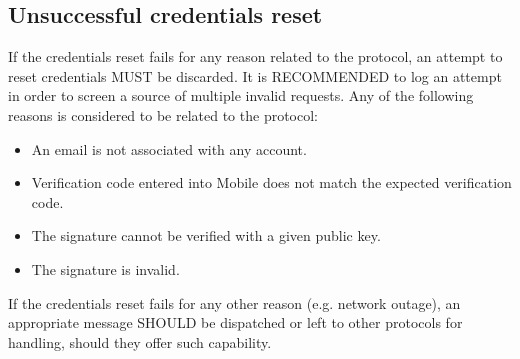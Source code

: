     \subsection{Unsuccessful credentials reset}
    If the credentials reset fails for any reason related to the protocol, an attempt to reset credentials MUST 
    be discarded. It is RECOMMENDED to log an attempt in order to screen a source of multiple invalid requests. 
    Any of the following reasons is considered to be related to the protocol:
        \begin{itemize}
            \item An email is not associated with any account.
            \item Verification code entered into Mobile does not match the expected verification code.
            \item The signature cannot be verified with a given public key.
            \item The signature is invalid.
        \end{itemize}
    If the credentials reset fails for any other reason (e.g. network outage), an appropriate message SHOULD be 
    dispatched or left to other protocols for handling, should they offer such capability.
